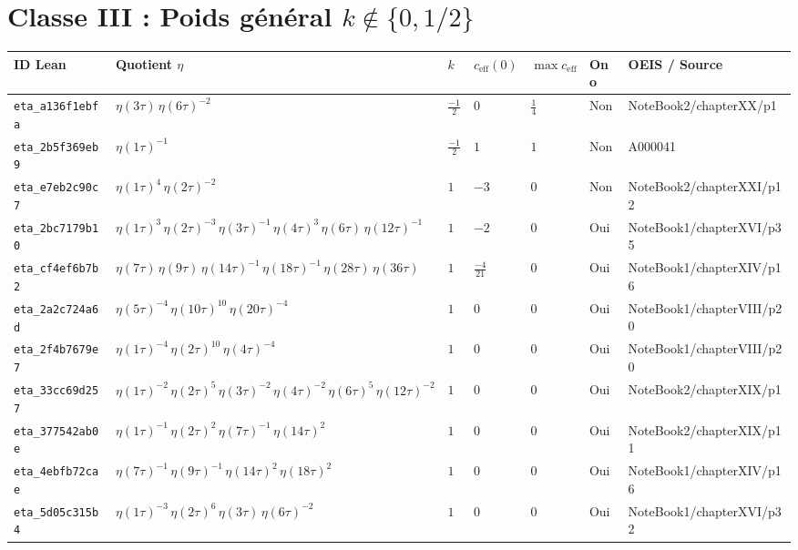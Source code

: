 \documentclass[11pt,twoside,openright]{book}
\begin{document}
\section{Classe III : Poids général $k \notin \{0, 1/2\}$}
\begin{longtable}{p{2.3cm}p{4.3cm}llllp{2.3cm}}
\toprule
\textbf{ID Lean} & \textbf{Quotient $\eta$} & $k$ & $c_{\text{eff}}(0)$ & $\max c_{\text{eff}}$ & \textbf{Ono} & \textbf{OEIS / Source} \\
\midrule
\endhead
\texttt{eta\_a136f1ebfa} & $\eta(3\tau)\, \eta(6\tau)^{-2}$ & $\frac{-1}{2}$ & $0$ & $\frac{1}{4}$ & Non & NoteBook2/chapterXX/p1 \\
\texttt{eta\_2b5f369eb9} & $\eta(1\tau)^{-1}$ & $\frac{-1}{2}$ & $1$ & $1$ & Non & A000041 \\
\texttt{eta\_e7eb2c90c7} & $\eta(1\tau)^{4}\, \eta(2\tau)^{-2}$ & $1$ & $-3$ & $0$ & Non & NoteBook2/chapterXXI/p12 \\
\texttt{eta\_2bc7179b10} & $\eta(1\tau)^{3}\, \eta(2\tau)^{-3}\, \eta(3\tau)^{-1}\, \eta(4\tau)^{3}\, \eta(6\tau)\, \eta(12\tau)^{-1}$ & $1$ & $-2$ & $0$ & Oui & NoteBook1/chapterXVI/p35 \\
\texttt{eta\_cf4ef6b7b2} & $\eta(7\tau)\, \eta(9\tau)\, \eta(14\tau)^{-1}\, \eta(18\tau)^{-1}\, \eta(28\tau)\, \eta(36\tau)$ & $1$ & $\frac{-4}{21}$ & $0$ & Oui & NoteBook1/chapterXIV/p16 \\
\texttt{eta\_2a2c724a6d} & $\eta(5\tau)^{-4}\, \eta(10\tau)^{10}\, \eta(20\tau)^{-4}$ & $1$ & $0$ & $0$ & Oui & NoteBook1/chapterVIII/p20 \\
\texttt{eta\_2f4b7679e7} & $\eta(1\tau)^{-4}\, \eta(2\tau)^{10}\, \eta(4\tau)^{-4}$ & $1$ & $0$ & $0$ & Oui & NoteBook1/chapterVIII/p20 \\
\texttt{eta\_33cc69d257} & $\eta(1\tau)^{-2}\, \eta(2\tau)^{5}\, \eta(3\tau)^{-2}\, \eta(4\tau)^{-2}\, \eta(6\tau)^{5}\, \eta(12\tau)^{-2}$ & $1$ & $0$ & $0$ & Oui & NoteBook2/chapterXIX/p1 \\
\texttt{eta\_377542ab0e} & $\eta(1\tau)^{-1}\, \eta(2\tau)^{2}\, \eta(7\tau)^{-1}\, \eta(14\tau)^{2}$ & $1$ & $0$ & $0$ & Oui & NoteBook2/chapterXIX/p11 \\
\texttt{eta\_4ebfb72cae} & $\eta(7\tau)^{-1}\, \eta(9\tau)^{-1}\, \eta(14\tau)^{2}\, \eta(18\tau)^{2}$ & $1$ & $0$ & $0$ & Oui & NoteBook1/chapterXIV/p16 \\
\texttt{eta\_5d05c315b4} & $\eta(1\tau)^{-3}\, \eta(2\tau)^{6}\, \eta(3\tau)\, \eta(6\tau)^{-2}$ & $1$ & $0$ & $0$ & Oui & NoteBook1/chapterXVI/p32 \\

\end{longtable}
\end{document}
